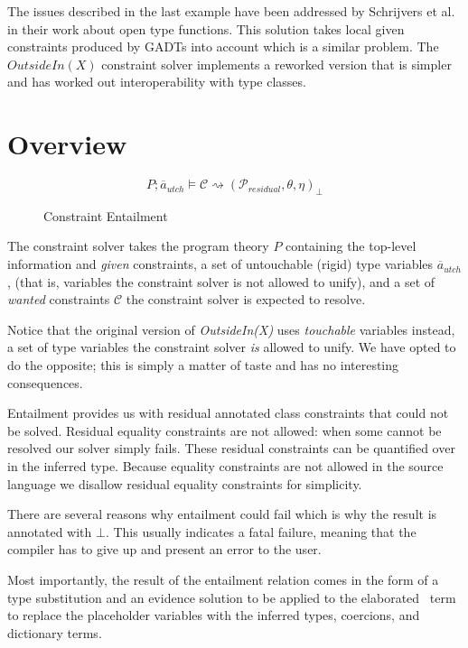 The issues described in the last example have been addressed by Schrijvers et
al.~\cite{type-checking-with-open-type-functions} in their work about open type
functions. This solution takes local given constraints produced by GADTs into
account which is a similar problem. The $OutsideIn(X)$ constraint solver
implements a reworked version that is simpler and has worked out
interoperability with type classes.

\section{Overview}

\begin{figure}
\[ %
P ; \overline{a}_{utch} \vDash \mathcal{C} \rightsquigarrow
(\mathcal{P}_{residual}, \theta, \eta)_\bot
\]
\caption{Constraint Entailment}
\end{figure}

The constraint solver takes the program theory $P$ containing the top-level
information and \textit{given} constraints, a set of untouchable (rigid) type variables
$\overline{a}_{utch}$, (that is, variables the constraint solver is not allowed
to unify), and a set of \textit{wanted} constraints $\mathcal{C}$ the constraint solver is expected to resolve.

Notice that the original version of \textit{OutsideIn(X)} uses \textit{touchable} variables instead, a set of
type variables the constraint solver \textit{is} allowed to unify. We have opted to do
the opposite; this is simply a matter of taste and has no interesting
consequences.

Entailment provides us with residual annotated class constraints that could not
be solved. Residual equality constraints are not allowed: when some cannot be
resolved our solver simply fails. These residual constraints can be quantified over
in the inferred type. Because equality constraints are not allowed in the
source language we disallow residual equality constraints for simplicity.

There are several reasons why entailment could fail which is why the result is
annotated with $\bot$. This usually indicates a fatal failure, meaning that the
compiler has to give up and present an error to the user.

Most importantly, the result of the entailment relation comes in the form of a
type substitution and an evidence solution to be applied to the elaborated
\systemfc ~term to replace the placeholder variables with the inferred types,
coercions, and dictionary terms.

